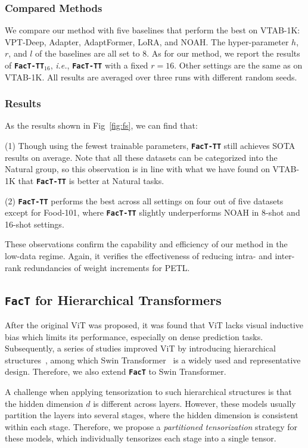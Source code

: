 \subsubsection{Compared Methods} We compare our method with five baselines that perform the best on VTAB-1K: VPT-Deep, Adapter, AdaptFormer, LoRA, and NOAH. The hyper-parameter $h$, $r$, and $l$ of the baselines are all set to 8. As for our method, we report the results of \texttt{\textbf{FacT-TT}}$_{16}$, \emph{i.e.}, \texttt{\textbf{FacT-TT}} with a fixed $r=16$. Other settings are the same as on VTAB-1K. All results are averaged over three runs with different random seeds.

\subsubsection{Results}
As the results shown in Fig~\ref{fig:fs}, we can find that:

(1) Though using the fewest trainable parameters, \texttt{\textbf{FacT-TT}} still achieves SOTA results on average. Note that all these datasets can be categorized into the Natural group, so this observation is in line with what we have found on VTAB-1K that \texttt{\textbf{FacT-TT}}  is better at Natural tasks.

(2) \texttt{\textbf{FacT-TT}} performs the best across all settings on four out of five datasets except for Food-101, where \texttt{\textbf{FacT-TT}} slightly underperforms NOAH in 8-shot and 16-shot settings.

These observations confirm the capability and efficiency of our method in the low-data regime. Again, it verifies the effectiveness of reducing intra- and inter-rank redundancies of weight increments for PETL. 

\subsection{\texttt{\textbf{FacT}} for Hierarchical Transformers} After the original ViT was proposed, it was found that ViT lacks visual inductive bias which limits its performance, especially on dense prediction tasks. Subsequently, a series of studies improved ViT by introducing hierarchical structures~\cite{swin,pvt,cvt}, among which Swin Transformer~\cite{swin} is a widely used and representative design. Therefore, we also extend \texttt{\textbf{FacT}} to Swin Transformer.

A challenge when applying tensorization to such hierarchical structures is that the hidden dimension $d$ is different across layers. However, these models usually partition the layers into several stages, where the hidden dimension is consistent within each stage. Therefore, we propose a \emph{partitioned tensorization} strategy for these models, which individually tensorizes each stage into a single tensor.

